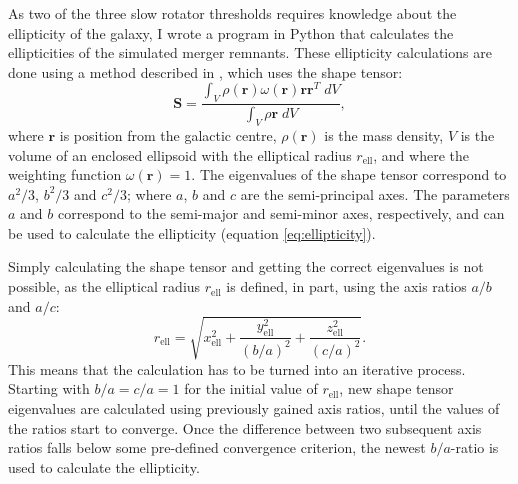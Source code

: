 \documentclass[english, twoside]{HYgradu}
\begin{document}
As two of the three slow rotator thresholds requires knowledge about the ellipticity of the galaxy, I wrote a program in Python that calculates the ellipticities of the simulated merger remnants. These ellipticity calculations are done using a method described in \cite{Zemp2011}, which uses the shape tensor:
\begin{equation}
\mathbf{S} = \frac{\int_V \rho(\mathbf{r}) \omega(\mathbf{r}) \mathbf{r} \mathbf{r}^T \; dV }{\int_V \rho{\mathbf{r}} \; dV},
\end{equation}
where $\mathbf{r}$ is position from the galactic centre, $\rho(\mathbf{r})$ is the mass density, $V$ is the volume of an enclosed ellipsoid with the elliptical radius $r_\mathrm{ell}$, and where the weighting function $\omega(\mathbf{r}) = 1$. The eigenvalues of the shape tensor correspond to $a^2/3$, $b^2/3$ and $c^2/3$; where $a$, $b$ and $c$ are the semi-principal axes. The parameters $a$ and $b$ correspond to the semi-major and semi-minor axes, respectively, and can be used to calculate the ellipticity (equation \ref{eq:ellipticity}). 

Simply calculating the shape tensor and getting the correct eigenvalues is not possible, as the elliptical radius $r_\mathrm{ell}$ is defined, in part, using the axis ratios $a/b$ and $a/c$:
\begin{equation}
r_\mathrm{ell} = \sqrt{x_\mathrm{ell}^2 + \frac{y_\mathrm{ell}^2}{(b/a)^2} + \frac{z_\mathrm{ell}^2}{(c/a)^2}}.
\end{equation}
This means that the calculation has to be turned into an iterative process. Starting with $b/a = c/a = 1$ for the initial value of $r_\mathrm{ell}$, new shape tensor eigenvalues are calculated using previously gained axis ratios, until the values of the ratios start to converge. Once the difference between two subsequent axis ratios falls below some pre-defined convergence criterion, the newest $b/a$-ratio is used to calculate the ellipticity.
\end{document}
